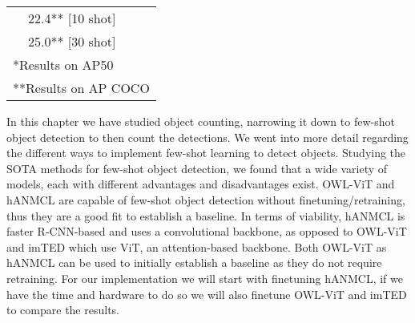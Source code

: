 \begin{table}[H]
\begin{tabular}{lll}
	\multicolumn{1}{|l|}{}                         & \multicolumn{1}{l|}{22.4** [10 shot]}           & \multicolumn{1}{l|}{}\\ \cline{2-2}
	\multicolumn{1}{|l|}{}                         & \multicolumn{1}{l|}{25.0** [30 shot]}           & \multicolumn{1}{l|}{}\\ \hline
	\multicolumn{3}{l}{*Results on AP50}\\
	\multicolumn{3}{l}{**Results on AP COCO}
	\end{tabular}
\end{table}
In this chapter we have studied object counting, narrowing it down to few-shot object detection to then count the detections. We went into more detail regarding the different ways to implement few-shot learning to detect objects. Studying the SOTA methods for few-shot object detection, we found that a wide variety of models, each with different advantages and disadvantages exist. OWL-ViT and hANMCL are capable of few-shot object detection without finetuning/retraining, thus they are a good fit to establish a baseline. In terms of viability, hANMCL is faster R-CNN-based and uses a convolutional backbone, as opposed to OWL-ViT and imTED which use ViT, an attention-based backbone. Both OWL-ViT as hANMCL can be used to initially establish a baseline as they do not require retraining. For our implementation we will start with finetuning hANMCL, if we have the time and hardware to do so we will also finetune OWL-ViT and imTED to compare the results.